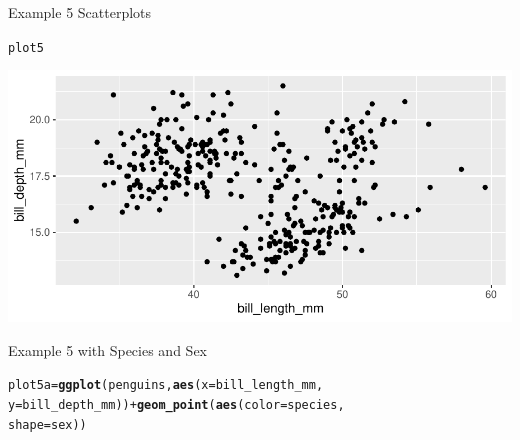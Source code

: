 \documentclass{beamer}\usepackage[]{graphicx}\usepackage[]{xcolor}
\makeatletter
\newcommand{\hlopt}[1]{\textcolor[rgb]{0,0,0}{#1}}%
\newcommand{\hlstd}[1]{\textcolor[rgb]{0.345,0.345,0.345}{#1}}%
\newcommand{\hlkwb}[1]{\textcolor[rgb]{0.69,0.353,0.396}{#1}}%
\newcommand{\hlkwc}[1]{\textcolor[rgb]{0.333,0.667,0.333}{#1}}%
\newcommand{\hlkwd}[1]{\textcolor[rgb]{0.737,0.353,0.396}{\textbf{#1}}}%
\newenvironment{kframe}{%
 \def\at@end@of@kframe{}%
 \ifinner\ifhmode%
  \def\at@end@of@kframe{\end{minipage}}%
  \begin{minipage}{\columnwidth}%
 \fi\fi%
 \def\FrameCommand##1{\hskip\@totalleftmargin \hskip-\fboxsep
 \colorbox{shadecolor}{##1}\hskip-\fboxsep
     \hskip-\linewidth \hskip-\@totalleftmargin \hskip\columnwidth}%
 \MakeFramed {\advance\hsize-\width
   \@totalleftmargin\z@ \linewidth\hsize
   \@setminipage}}%
 {\par\unskip\endMakeFramed%
 \at@end@of@kframe}
\newenvironment{knitrout}{}{} %
\makeatother
\begin{document}
\begin{frame}[fragile]{Example 5 Scatterplots}
\begin{knitrout}
\color{fgcolor}\begin{kframe}
\begin{alltt}
\hlstd{plot5}
\end{alltt}
\end{kframe}
\includegraphics[width=0.95\linewidth]{figure/unnamed-chunk-27-1} 
\end{knitrout}

\end{frame}
\begin{frame}[fragile]{Example 5 with Species and Sex}
\begin{knitrout}
\color{fgcolor}\begin{kframe}
\begin{alltt}
\hlstd{plot5a} \hlkwb{=} \hlkwd{ggplot}\hlstd{(penguins,} \hlkwd{aes}\hlstd{(}\hlkwc{x} \hlstd{= bill_length_mm,}
    \hlkwc{y} \hlstd{= bill_depth_mm))} \hlopt{+} \hlkwd{geom_point}\hlstd{(}\hlkwd{aes}\hlstd{(}\hlkwc{color} \hlstd{= species,}
    \hlkwc{shape} \hlstd{= sex))}
\end{alltt}
\end{kframe}
\end{knitrout}

\end{frame}
\end{document}
